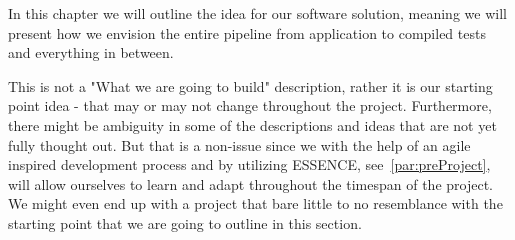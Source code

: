 In this chapter we will outline the idea for our software solution, meaning we will present how we envision the entire pipeline from application to compiled tests and everything in between.

This is not a "What we are going to build" description, rather it is our starting point idea - that may or may not change throughout the project.
Furthermore, there might be ambiguity in some of the descriptions and ideas that are not yet fully thought out.
But that is a non-issue since we with the help of an agile inspired development process and by utilizing ESSENCE, see~\autoref{par:preProject}, will allow ourselves to learn and adapt throughout the timespan of the project.
We might even end up with a project that bare little to no resemblance with the starting point that we are going to outline in this section.
